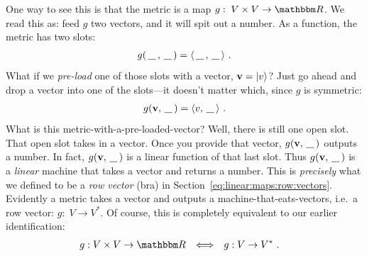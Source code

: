 \documentclass[12pt]{article}
\begin{document}
One way to see this is that the metric is a map $g:\;V\times V \to \RR$. We read this as: feed $g$ two vectors, and it will spit out a number. As a function, the metric has two slots:
\begin{align}
    g(\smallslot, \smallslot) = \la \smallslot, \smallslot \ra \ .
\end{align}
What if we \emph{pre-load} one of those slots with a vector, $\mathbf{v}=\left|v\right\rangle$? Just go ahead and drop a vector into one of the slots---it doesn't matter which, since $g$ is symmetric:
\begin{align}
    g(\vec{v},\smallslot) = \la v, \smallslot \ra \ .
\end{align}
What is this metric-with-a-pre-loaded-vector? Well, there is still one open slot. That open slot takes in a vector. Once you provide that vector, $g(\vec{v},\smallslot)$ outputs a number. In fact, $g(\vec{v},\smallslot)$ is a linear function of that last slot. Thus $g(\vec{v},\smallslot)$ is a \emph{linear} machine that takes a vector and returns a number. This is \emph{precisely} what we defined to be a \emph{row vector} (bra) in Section~\ref{eq:linear:maps:row:vectors}. Evidently a metric takes a vector and outputs a machine-that-eats-vectors, i.e.~a row vector: $g:\;V\to V^*$. Of course, this is completely equivalent to our earlier identification:
\begin{align}
    g:&\;V\times V \to \RR
    &
    \Longleftrightarrow
    &&
    g:&\;V \to V^* \ .
\end{align}
\end{document}
